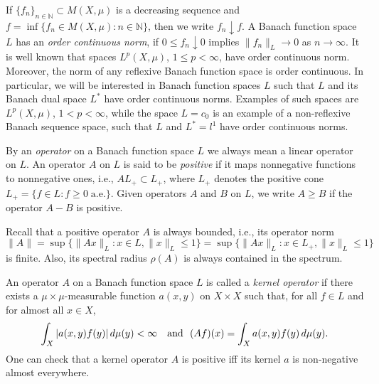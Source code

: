 \documentclass[12pt, reqno]{amsart}
\theoremstyle{definition}
\theoremstyle{remark}
\numberwithin{equation}{section}
\newcommand{\be}{\begin{equation}}
\newcommand{\ee}{\end{equation}}
\newcommand{\NN}{\mathbb{N}}
\begin{document}
If $\{f_n\}_{n\in \mathbb{N}} \subset M(X,\mu)$ is a decreasing sequence and
$f=\inf\{f_n \in M(X,\mu): n \in \NN \}$, then we write $f_n \downarrow f$. %
A Banach function space $L$ has an {\it order continuous norm}, if $0\le f_n \downarrow 0$
implies $\|f_n\|_L \to 0$ as $n \to \infty$. It is well known that spaces $L^p  (X,\mu)$, $1\le p< \infty$, have order continuous
norm. Moreover, the norm of any reflexive Banach function space is
order continuous. %
In particular, we will be interested in  Banach function spaces $L$ such that $L$ and its Banach dual space $L^*$ have order continuous norms. Examples of such spaces are $L^p  (X,\mu)$, $1< p< \infty$, while the space
$L=c_0$ %
is an example of a non-reflexive Banach sequence space, such that $L$ and  $L^*=l^1$ have order continuous
norms.

By an {\it operator} on a Banach function space $L$ we always mean a linear
operator on $L$.  An operator $A$ on $L$ is said to be {\it positive}
if it maps nonnegative functions to nonnegative ones, i.e., $AL_+ \subset L_+$, where $L_+$ denotes the positive cone $L_+ =\{f\in L : f\ge 0 \; \mathrm{a.e.}\}$.
Given operators $A$ and $B$ on $L$, we write $A \ge B$ if the operator $A - B$ is positive.

Recall that a positive  operator $A$ is always bounded, i.e., its operator norm
\be
\|A\|=\sup\{\|Ax\|_L : x\in L, \|x\|_L \le 1\}=\sup\{\|Ax\|_L : x\in L_+, \|x\|_L \le 1\}
\label{equiv_op}
\ee
is finite.
Also, its spectral radius $\rho (A)$ is always contained in the spectrum.


An operator $A$ on a Banach function space $L$ is called a {\it kernel operator} if
there exists a $\mu \times \mu$-measurable function
$a(x,y)$ on $X \times X$ such that, for all $f \in L$ and for almost all $x \in X$,
$$ \int_X |a(x,y) f(y)| \, d\mu(y) < \infty \ \ \ {\rm and} \ \
   (Af)(x) = \int_X a(x,y) f(y) \, d\mu(y)  .$$
One can check that a kernel operator $A$ is positive iff
its kernel $a$ is non-negative almost everywhere.
\end{document}

